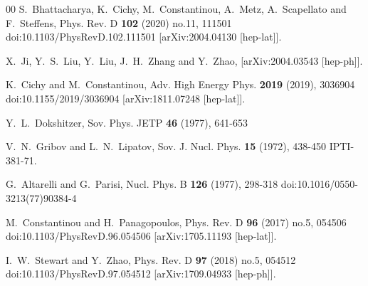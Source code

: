 \documentclass[preprint,12pt]{elsarticle}
\begin{document}
\begin{thebibliography}{00}
S.~Bhattacharya, K.~Cichy, M.~Constantinou, A.~Metz, A.~Scapellato and F.~Steffens,
Phys. Rev. D \textbf{102} (2020) no.11, 111501
doi:10.1103/PhysRevD.102.111501
[arXiv:2004.04130 [hep-lat]].

X.~Ji, Y.~S.~Liu, Y.~Liu, J.~H.~Zhang and Y.~Zhao,
[arXiv:2004.03543 [hep-ph]].

K.~Cichy and M.~Constantinou,
Adv. High Energy Phys. \textbf{2019} (2019), 3036904
doi:10.1155/2019/3036904
[arXiv:1811.07248 [hep-lat]].

Y.~L.~Dokshitzer,
Sov. Phys. JETP \textbf{46} (1977), 641-653

V.~N.~Gribov and L.~N.~Lipatov,
Sov. J. Nucl. Phys. \textbf{15} (1972), 438-450
IPTI-381-71.

G.~Altarelli and G.~Parisi,
Nucl. Phys. B \textbf{126} (1977), 298-318
doi:10.1016/0550-3213(77)90384-4

M.~Constantinou and H.~Panagopoulos,
Phys. Rev. D \textbf{96} (2017) no.5, 054506
doi:10.1103/PhysRevD.96.054506
[arXiv:1705.11193 [hep-lat]].

I.~W.~Stewart and Y.~Zhao,
Phys. Rev. D \textbf{97} (2018) no.5, 054512
doi:10.1103/PhysRevD.97.054512
[arXiv:1709.04933 [hep-ph]].


\end{thebibliography}
\end{document}
